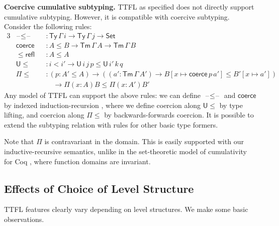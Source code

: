 \documentclass[a4paper,UKenglish,cleveref, autoref, thm-restate]{lipics-v2021}
\theoremstyle{remark}
\theoremstyle{definition}
\newcommand{\Seti}{\mathsf{Set}}
\newcommand{\Ty}{\mathsf{Ty}}
\newcommand{\Tm}{\mathsf{Tm}}
\newcommand{\U}{\mathsf{U}}
\newcommand{\blank}{\mathord{\hspace{1pt}\text{--}\hspace{1pt}}}
\renewcommand{\U}{\mathsf{U}}
\newcommand{\msf}[1]{\mathsf{#1}}
\begin{document}
\textbf{Coercive cumulative subtyping.}
TTFL as specified does not directly support cumulative subtyping. However, it is
compatible with coercive subtyping. Consider the following rules:
\begin{alignat*}{3}
  &\blank\!\leq\!\blank &&: \Ty\,\Gamma\,i \to \Ty\,\Gamma\,j \to \Seti\\
  &\msf{coerce} &&: A \leq B \to \Tm\,\Gamma\,A \to \Tm\,\Gamma\,B\\
  &\leq\!\msf{refl} &&: A \leq A \\
  &\U\!\leq    &&: i < i' \to \U\,i\,j\,p \leq \U\,i'\,k\,q\\
  &\Pi\!\leq   &&: (p : A' \leq A) \to ((a' : \Tm\,\Gamma\,A')
  \to B[x \mapsto \msf{coerce}\,p\,a'] \leq B'[x \mapsto a'])\\
  & && \hspace{1em} \to \Pi(x : A) B \leq \Pi (x : A') B'
\end{alignat*}
Any model of TTFL can support the above rules: we can define
$\blank\!\leq\!\blank$ and $\msf{coerce}$ by indexed induction-recursion
\cite{indexedir}, where we define coercion along $\U\!\leq$ by type lifting, and
coercion along $\Pi\!\leq$ by backwards-forwards coercion. It is possible to
extend the subtyping relation with rules for other basic type formers.

Note that $\Pi$ is contravariant in the domain. This is easily supported with
our inductive-recursive semantics, unlike in the set-theoretic model of
cumulativity for Coq \cite{timany18cumulative}, where function domains are
invariant.

\subsection{Effects of Choice of Level Structure}

TTFL features clearly vary depending on level structures. We make some basic
observations.
\end{document}
